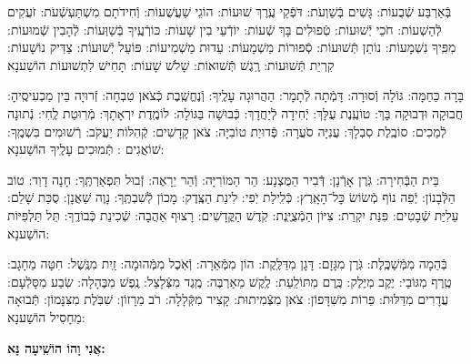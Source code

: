 \documentclass[twoside, openany, parskip=half, 11pt]{book}
\begin{document}
\begin{sometimes}
 בְּֿאַרְבַּע שְֿׁבֻעוֹת: גָּשִׁים בְּֿשַׁוְעֹת: דֹּפְֿקֵי עֶֽרֶךְ שׁוּעוֹת: הוֹגֵי שַׁעֲשֻׁעוֹת: וְֿחִידֹתָם מִשְׁתַּעְשְֿׁעֹת: זֹעֲקִים לְֿהַשְׁעוֹת: חֹכֵי יְֿשׁוּעוֹת: טְֿפוּלִים בָּךְ שְֿׁעוֹת: יוֹדְֿעֵי בִין שָׁעוֹת: כּוֹרְֿעֶֽיךָ בְּֿשַׁוְּעוֹת: לְֿהָבִין שְֿׁמוּעוֹת: מִפִּֽיךָ נִשְׁמָעוֹת: נוֹתֵן תְּֿשׁוּעוֹת: סְֿפוּרוֹת מַשְׁמָעוֹת: עֵדוּת מַשְׁמִיעוֹת: פּוֹעֵל יְֿשׁוּעוֹת: צַדִּיק נוֹשָׁעוֹת: קִרְיַת תְּֿשׁוּעוֹת: רֶֽגֶשׁ תְּֿשׁוּאוֹת:
 שָׁלֹשׁ שָׁעוֹת:
 תָּחִישׁ לִתְשׁוּעוֹת הוֹשַׁענָא



בָּרָה כַּחַמָּה: גּוֹלָה וְֿסוּרָה: דָּמְֿתָה לְֿתָמָר: הַהֲרוּגָה עָלֶֽיךָ: וְֿנֶחֱשֶֽׁבֶת כְּֿצֹאן טִבְחָה: זְֿרוּיָה בֵּין מַכְעִיסֶֽיהָ: חֲבוּקָה וּדְבוּקָה בָּךְ: טוֹעֶֽנֶת עֻלָּךְ: יְֿחִידָה לְֿיַחֲדָךְ: כְּֿבוּשָׁה בַּגּוֹלָה: לוֹמֶֽדֶת יִרְאָתָךְ: מְֿרֽוּטַת לֶֽחִי: נְֿתוּנָה לְֿמַכִים: סוֹבֶֽלֶת סִבְלָךְ: עֲנִיָּה סֹעֲרָה: פְּֿדוּיַת טוֹבִיָּה: צֹאן קָדָשִׁים: קְֿהִלּוֹת יַעֲקֹב: רְֿשׁוּמִים בִּשְׁמֶֽךָ:
 שׁוֹאֲגִים :
 תְּֿמוּכִים עָלֶֽיךָ הוֹשַׁענָא:


 בֵּית הַבְּֿחִירָה: גֹּֽרֶן אָרְֿנָן: דְּֿבִיר הַמֻּצְנָע: הַר הַמּוֹרִיָּה: וְֿהַר יֵרָאֶה: זְֿבוּל תִּפְאַרְתֶּֽךָ: חָנָה דָוִד: טוֹב הַלְּֿבָנוֹן: יְֿפֵה נוֹף מְֿשׂוֹשׂ כׇּל־הָאָֽרֶץ: כְּֿלִֽילַת יֹֽפִי: לִינַת הַצֶּֽדֶק: מָכוֹן לְֿשִׁבְתֶּֽךָ: נָוֶה שַׁאֲנָן: סֻכַּת שָׁלֵם: עַלִיַּת שְֿׁבָטִים: פִּנַּת יִקְרַת: צִיּוֹן הַמְֿצֻיֶּֽנֶת: קֹֽדֶשׁ הַקֳּדָשִׁים: רָצוּף אַהֲבָה:
 שְֿׁכִינַת כְּֿבוֹדֶֽךָ:
 תֵּל תַּלְפִּיּוֹת הוֹשַׁענָא:


 בְּֿהֵמָה מִמְּֿשַׁכֶּֽלֶת: גֹּֽרֶן מִגָּזָם: דָּגָן מִדַּלֶּֽקֶת: הוֹן מִמְּֿאֵרָה: וְֿאֹֽכֶל מִמְּֿהוּמָה: זַֽיִת מִנֶּֽשֶׁל: חִטָּה מֵחָגָב: טֶֽרֶף מִגּוֹבַי: יֶקֶב מִיֶּלֶק: כֶּֽרֶם מִתּוֹלַֽעַת: לֶֽקֶשׁ מֵאַרְבֶּה: מֶֽגֶד מִצְּֿלָצַל: נֶֽפֶשׁ מִבֶּהָלָה: שֽׂבַע מִסָּלְֿעָם: עֲדָרִים מִדַּלּוּת: פֵּרוֹת מִשִּׁדָּפוֹן: צֹאן מִצְּֿמִיתוּת: קָצִיר מִקְּֿלָלָה: רֹב מֵרָזוֹן:
 שִׁבֹּֽלֶת מִצִּנָּמוֹן:
 תְּֿבוּאָה מֵחָסִיל הוֹשַׁענָא:


\label{ani vho}
\begin{large}
\textbf{אֲנִי וָהוֹ הוֹשִֽׁיעָה נָּא:}
\end{large}




\end{sometimes}
\end{document}
